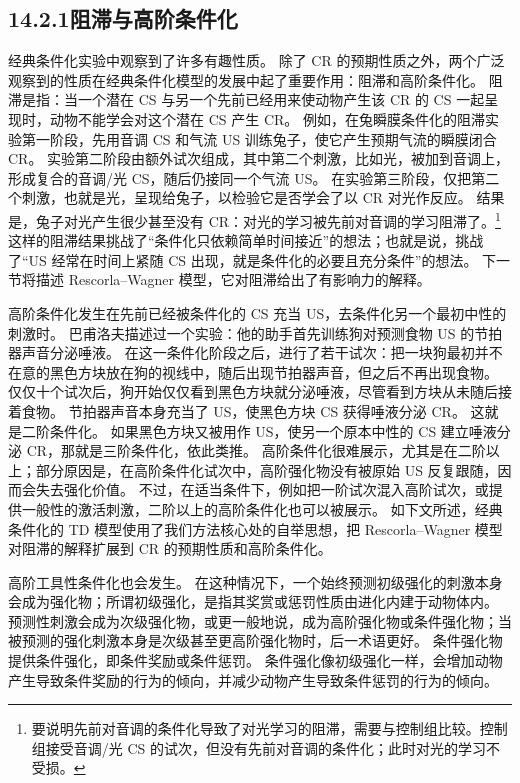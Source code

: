 \documentclass[UTF8, 12pt, fontset=fandol, oneside]{ctexart}
\begin{document}
\subsection*{14.2.1\quad 阻滞与高阶条件化}

经典条件化实验中观察到了许多有趣性质。
除了 CR 的预期性质之外，两个广泛观察到的性质在经典条件化模型的发展中起了重要作用：阻滞和高阶条件化。
阻滞是指：当一个潜在 CS 与另一个先前已经用来使动物产生该 CR 的 CS 一起呈现时，动物不能学会对这个潜在 CS 产生 CR。
例如，在兔瞬膜条件化的阻滞实验第一阶段，先用音调 CS 和气流 US 训练兔子，使它产生预期气流的瞬膜闭合 CR。
实验第二阶段由额外试次组成，其中第二个刺激，比如光，被加到音调上，形成复合的音调/光 CS，随后仍接同一个气流 US。
在实验第三阶段，仅把第二个刺激，也就是光，呈现给兔子，以检验它是否学会了以 CR 对光作反应。
结果是，兔子对光产生很少甚至没有 CR：对光的学习被先前对音调的学习阻滞了。\footnote{要说明先前对音调的条件化导致了对光学习的阻滞，需要与控制组比较。控制组接受音调/光 CS 的试次，但没有先前对音调的条件化；此时对光的学习不受损。}
这样的阻滞结果挑战了“条件化只依赖简单时间接近”的想法；也就是说，挑战了“US 经常在时间上紧随 CS 出现，就是条件化的必要且充分条件”的想法。
下一节将描述 Rescorla--Wagner 模型，它对阻滞给出了有影响力的解释。

高阶条件化发生在先前已经被条件化的 CS 充当 US，去条件化另一个最初中性的刺激时。
巴甫洛夫描述过一个实验：他的助手首先训练狗对预测食物 US 的节拍器声音分泌唾液。
在这一条件化阶段之后，进行了若干试次：把一块狗最初并不在意的黑色方块放在狗的视线中，随后出现节拍器声音，但之后不再出现食物。
仅仅十个试次后，狗开始仅仅看到黑色方块就分泌唾液，尽管看到方块从未随后接着食物。
节拍器声音本身充当了 US，使黑色方块 CS 获得唾液分泌 CR。
这就是二阶条件化。
如果黑色方块又被用作 US，使另一个原本中性的 CS 建立唾液分泌 CR，那就是三阶条件化，依此类推。
高阶条件化很难展示，尤其是在二阶以上；部分原因是，在高阶条件化试次中，高阶强化物没有被原始 US 反复跟随，因而会失去强化价值。
不过，在适当条件下，例如把一阶试次混入高阶试次，或提供一般性的激活刺激，二阶以上的高阶条件化也可以被展示。
如下文所述，经典条件化的 TD 模型使用了我们方法核心处的自举思想，把 Rescorla--Wagner 模型对阻滞的解释扩展到 CR 的预期性质和高阶条件化。

高阶工具性条件化也会发生。
在这种情况下，一个始终预测初级强化的刺激本身会成为强化物；所谓初级强化，是指其奖赏或惩罚性质由进化内建于动物体内。
预测性刺激会成为次级强化物，或更一般地说，成为高阶强化物或条件强化物；当被预测的强化刺激本身是次级甚至更高阶强化物时，后一术语更好。
条件强化物提供条件强化，即条件奖励或条件惩罚。
条件强化像初级强化一样，会增加动物产生导致条件奖励的行为的倾向，并减少动物产生导致条件惩罚的行为的倾向。
\end{document}
